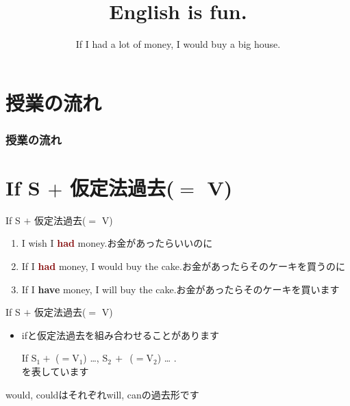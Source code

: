 \documentclass[aspectratio=169,xcolor={dvipsnames,table}]{beamer}
\title{English is fun.}
\subtitle{If I had a lot of money, I would buy a big house.}
\author{}
\institute[]{}
\date[]
\begin{document}
\begin{frame}[plain]
  \titlepage
\end{frame}

\section*{授業の流れ}
\begin{frame}[plain]
  \frametitle{授業の流れ}
  \tableofcontents
\end{frame}
\section{If S $+$ 仮定法過去($=$ V)}

\begin{frame}[plain]{If S $+$ 仮定法過去($=$ V)}
 \large
\begin{enumerate} 
 \item I wish I \textcolor{Maroon}{\bfseries had} money.\hfill{\scriptsize お金があったらいいのに}
 \item If I \textcolor{Maroon}{\bfseries had} money, I would buy the cake.\hfill{\scriptsize お金があったらそのケーキを買うのに}
 \item If I \textcolor{NavyBlue}{\bfseries have} money, I will buy the cake.\hfill{\scriptsize お金があったらそのケーキを買います}
\end{enumerate}


\begin{block}{If S $+$ 仮定法過去($=$ V)}
\small
\begin{itemize}[square]
 \item ifと仮定法過去を組み合わせることがあります\par
If $\text{S}_{1} +$ ($= \text{V}_{1}$) \ldots \hspace{2pt},\hspace{10pt}
 $\text{S}_{2}\,+$ \,($=\text{V}_{2}$) \ldots\hspace{2pt} .\\[10pt]
\hfill{}を表しています
\end{itemize}

\hfill{\scriptsize would, couldはそれぞれwill, canの過去形です}
 

\end{block}
\end{frame}
\end{document}
